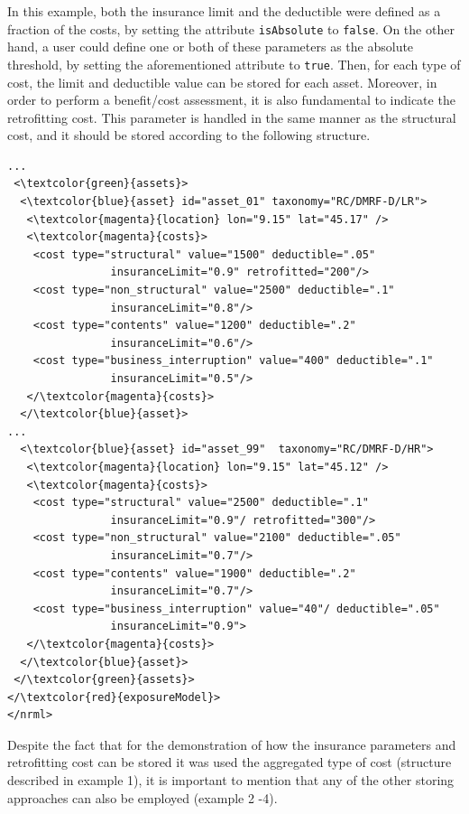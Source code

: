 In this example, both the insurance limit and the deductible were defined as a fraction of the costs, by setting the attribute \Verb+isAbsolute+ to \Verb+false+. On the other hand, a user could define one or both of these parameters as the absolute threshold, by setting the aforementioned attribute to \Verb+true+. Then, for each type of cost, the limit and deductible value can be stored for each asset.
Moreover, in order to perform a benefit/cost assessment, it is also fundamental to indicate the retrofitting cost. This parameter is handled in the same manner as the structural cost, and it should be stored according to the following structure. 

\begin{Verbatim}[frame=single, commandchars=\\\{\}, samepage=false]
...
 <\textcolor{green}{assets}>
  <\textcolor{blue}{asset} id="asset_01" taxonomy="RC/DMRF-D/LR">
   <\textcolor{magenta}{location} lon="9.15" lat="45.17" />
   <\textcolor{magenta}{costs}>
    <cost type="structural" value="1500" deductible=".05" 
                insuranceLimit="0.9" retrofitted="200"/>
    <cost type="non_structural" value="2500" deductible=".1" 
                insuranceLimit="0.8"/>
    <cost type="contents" value="1200" deductible=".2" 
                insuranceLimit="0.6"/>
    <cost type="business_interruption" value="400" deductible=".1" 
                insuranceLimit="0.5"/>
   </\textcolor{magenta}{costs}>
  </\textcolor{blue}{asset}>
...
  <\textcolor{blue}{asset} id="asset_99"  taxonomy="RC/DMRF-D/HR">
   <\textcolor{magenta}{location} lon="9.15" lat="45.12" />
   <\textcolor{magenta}{costs}>
    <cost type="structural" value="2500" deductible=".1" 
                insuranceLimit="0.9"/ retrofitted="300"/>
    <cost type="non_structural" value="2100" deductible=".05" 
                insuranceLimit="0.7"/>
    <cost type="contents" value="1900" deductible=".2" 
                insuranceLimit="0.7"/>
    <cost type="business_interruption" value="40"/ deductible=".05" 
                insuranceLimit="0.9">
   </\textcolor{magenta}{costs}>
  </\textcolor{blue}{asset}>
 </\textcolor{green}{assets}>
</\textcolor{red}{exposureModel}>
</nrml>
\end{Verbatim}

Despite the fact that for the demonstration of how the insurance parameters and retrofitting cost can be stored it was used the aggregated type of cost (structure described in example 1), it is important to mention that any of the other storing approaches can also be employed (example 2 -4).

